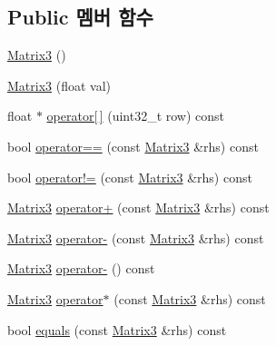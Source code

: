 \subsection*{Public 멤버 함수}
\begin{DoxyCompactItemize}
\item 
\hyperlink{classcpf_1_1_matrix3_a449a9e860e87c053355379869430cbb7}{Matrix3} ()
\item 
\hyperlink{classcpf_1_1_matrix3_a8f77b0fa80d6f9ce992fb88d4743b208}{Matrix3} (float val)
\item 
float $\ast$ \hyperlink{classcpf_1_1_matrix3_a75a890aec8069c98a80769da97b5a889}{operator\mbox{[}$\,$\mbox{]}} (uint32\+\_\+t row) const
\item 
bool \hyperlink{classcpf_1_1_matrix3_a9269345dbe1cc4b6846295b19e3ca502}{operator==} (const \hyperlink{classcpf_1_1_matrix3}{Matrix3} \&rhs) const
\item 
bool \hyperlink{classcpf_1_1_matrix3_ad53c54e4df535f11099adeb266bcd425}{operator!=} (const \hyperlink{classcpf_1_1_matrix3}{Matrix3} \&rhs) const
\item 
\hyperlink{classcpf_1_1_matrix3}{Matrix3} \hyperlink{classcpf_1_1_matrix3_aefaf91ae875e992ac59e8bb504b63a02}{operator+} (const \hyperlink{classcpf_1_1_matrix3}{Matrix3} \&rhs) const
\item 
\hyperlink{classcpf_1_1_matrix3}{Matrix3} \hyperlink{classcpf_1_1_matrix3_a3d1739da0e67b8c0106fbafbb7132153}{operator-\/} (const \hyperlink{classcpf_1_1_matrix3}{Matrix3} \&rhs) const
\item 
\hyperlink{classcpf_1_1_matrix3}{Matrix3} \hyperlink{classcpf_1_1_matrix3_a781b93ac9fbc6dec65f643bd63682ce6}{operator-\/} () const
\item 
\hyperlink{classcpf_1_1_matrix3}{Matrix3} \hyperlink{classcpf_1_1_matrix3_a564a8ee457d86385b78bd78d4189c520}{operator$\ast$} (const \hyperlink{classcpf_1_1_matrix3}{Matrix3} \&rhs) const
\item 
bool \hyperlink{classcpf_1_1_matrix3_a6a2b12e2cba8a6f03c686a363e55934d}{equals} (const \hyperlink{classcpf_1_1_matrix3}{Matrix3} \&rhs) const
\end{DoxyCompactItemize}
